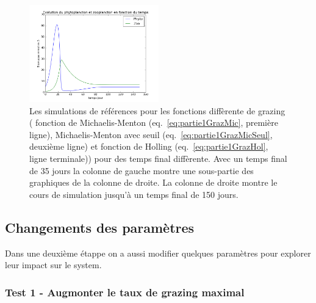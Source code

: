 {\begin{figure}[h]
  \includegraphics[width=0.5\textwidth]{partie1/refHol150.png}
  \caption{Les simulations de références pour les fonctions diffèrente de grazing (
fonction de Michaelis-Menton (eq.~\ref{eq:partie1GrazMic}, première ligne),
Michaelis-Menton avec seuil (eq.~\ref{eq:partie1GrazMicSeul}, deuxième ligne) et fonction de
Holling (eq.~\ref{eq:partie1GrazHol}, ligne terminale)) pour des temps final diffèrente.
Avec un temps final de 35 jours la colonne de gauche montre une sous-partie des graphiques
de la colonne de droite. La colonne de droite montre le cours de simulation jusqu'à un temps
final de 150 jours.}
  \label{fig:partie1RefSimulations}
\end{figure}

\clearpage
\subsection{Changements des paramètres}

\par{
Dans une deuxième étappe on a aussi modifier quelques paramètres pour explorer leur impact sur le system.
}

\subsubsection{Test 1 - Augmonter le taux de grazing maximal}
\par{

}}
